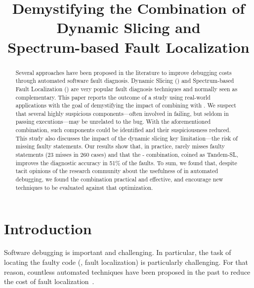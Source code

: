 \documentclass{article}
\title{Demystifying the Combination of Dynamic Slicing and \\ Spectrum-based Fault
Localization}
\begin{document}
\maketitle

\begin{abstract}
Several approaches have been proposed in the literature to improve debugging
costs through automated software fault diagnosis.  Dynamic Slicing (\ds{}) and
Spectrum-based Fault Localization (\sfl{}) are very popular fault diagnosis
techniques and normally seen as complementary.  This paper reports the outcome
of a study using real-world applications with the goal of demystifying the
impact of combining \ds{} with \sfl{}.  We suspect that several highly
suspicious components---often involved in failing, but seldom in passing
executions---may be unrelated to the bug. With the aforementioned combination,
such components could be identified and their suspiciousness reduced.  This
study also discusses the impact of the dynamic slicing key limitation---the risk
of missing faulty statements. Our results show that, in practice, \ds{} rarely
misses faulty statements (23 misses in 260 cases) and that the
\ds{}-\sfl{} combination, coined as Tandem-SL, improves the diagnostic accuracy
in 51\% of the faults. To sum, we found that, despite tacit opinions of the
research community about the usefulness of \ds{} in automated debugging, we
found the combination practical and effective, and encourage new \sfl{}
techniques to be evaluated against that optimization.
\end{abstract}


\section{Introduction}

Software debugging is important and challenging. In particular, the task of locating the faulty
code (\ie{}, fault localization) is particularly challenging. For that reason,
countless automated techniques have been proposed in the past to reduce the cost
of fault localization~\cite{7390282}.

\end{document}
